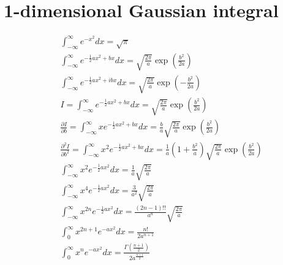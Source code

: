 \section*{1-dimensional Gaussian integral}
\begin{center}
    \begin{equation*}
        \begin{aligned}
            &\int_{-\infty}^{\infty} e^{-x^{2}} d x=\sqrt{\pi}\\
            &\int_{-\infty}^{\infty} e^{-\frac{1}{2} a x^{2}+b x} d x=\sqrt{\frac{2 \pi}{a}} \exp \left(\frac{b^{2}}{2 a}\right)\\
            &\int_{-\infty}^{\infty} e^{-\frac{1}{2} a x^{2}+i b x} d x=\sqrt{\frac{2 \pi}{a}} \exp \left(-\frac{b^{2}}{2 a}\right)\\
            &I=\int_{-\infty}^{\infty} e^{-\frac{1}{2} a x^{2}+b x} d x=\sqrt{\frac{2 \pi}{a}} \exp \left(\frac{b^{2}}{2 a}\right)\\
            &\frac{\partial I}{\partial b}=\int_{-\infty}^{\infty} x e^{-\frac{1}{2} a x^{2}+b x} d x=\frac{b}{a} \sqrt{\frac{2 \pi}{a}} \exp \left(\frac{b^{2}}{2 a}\right)\\
            &\frac{\partial^{2} I}{\partial b^{2}}=\int_{-\infty}^{\infty} x^{2} e^{-\frac{1}{2} a x^{2}+b x} d x=\frac{1}{a}\left(1+\frac{b^{2}}{a}\right) \sqrt{\frac{2 \pi}{a}} \exp \left(\frac{b^{2}}{2 a}\right)\\
            &\int_{-\infty}^{\infty} x^{2} e^{-\frac{1}{2} a x^{2}} d x=\frac{1}{a} \sqrt{\frac{2 \pi}{a}}\\
            &\int_{-\infty}^{\infty} x^{4} e^{-\frac{1}{2} a x^{2}} d x=\frac{3}{a^{2}} \sqrt{\frac{2 \pi}{a}}\\
            &\int_{-\infty}^{\infty} x^{2 n} e^{-\frac{1}{2} a x^{2}} d x=\frac{(2 n-1) ! !}{a^{n}} \sqrt{\frac{2 \pi}{a}}\\
            &\int_{0}^{\infty} x^{2 n+1} e^{-a x^{2}} d x=\frac{n !}{2 a^{n+1}}\\
            &\int_{0}^{\infty} x^{n} e^{-a x^{2}} d x=\frac{\Gamma\left(\frac{n+1}{2}\right)}{2 a^{\frac{n+1}{2}}}
        \end{aligned}
    \end{equation*}
\end{center}

